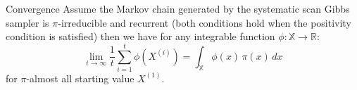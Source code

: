 \begin{frame}{Convergence}
	Assume the Markov chain generated by the systematic scan Gibbs sampler is $\pi$-irreducible 
	and recurrent (both conditions hold when the positivity condition is satisfied) then we 
	have for any integrable function $\phi : \mathbb{X} \to \mathbb{R}$:
	\[
		\lim_{t \to \infty} \frac{1}{t} \sum_{i=1}^{t} \phi\left(X^{(i)}\right) = \int_{\mathbb{X}} \phi(x) \, \pi(x) \, dx
	\]
	for $\pi$-almost all starting value $X^{(1)}$.
\end{frame}